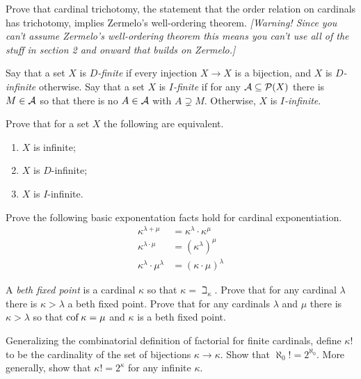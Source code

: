 \documentclass[10pt]{amsart}
\begin{document}
\begin{problem}
Prove that cardinal trichotomy, the statement that the order relation on cardinals has trichotomy, implies Zermelo's well-ordering theorem. \emph{[Warning! Since you can't assume Zermelo's well-ordering theorem this means you can't use all of the stuff in section 2 and onward that builds on Zermelo.]}
\end{problem}


\begin{problem}
Say that a set $X$ is \emph{$D$-finite} if every injection $X \to X$ is a bijection, and $X$ is \emph{$D$-infinite} otherwise. Say that a set $X$ is \emph{$I$-finite} if for any $\mathcal{A} \subseteq \mathcal{P}(X)$ there is $M \in \mathcal{A}$ so that there is no $A \in \mathcal{A}$ with $A \supsetneq M$. Otherwise, $X$ is \emph{$I$-infinite}.

Prove that for a set $X$ the following are equivalent.
\begin{enumerate}
\item $X$ is infinite;
\item $X$ is $D$-infinite;
\item $X$ is $I$-infinite.
\end{enumerate}
\end{problem}

\begin{problem}
Prove the following basic exponentation facts hold for cardinal exponentiation.
\begin{align*}
\kappa^{\lambda + \mu} &= \kappa^\lambda \cdot \kappa^\mu \\
\kappa^{\lambda \cdot \mu} &= \left(\kappa^\lambda\right)^\mu \\
\kappa^\lambda \cdot \mu^\lambda &= (\kappa \cdot \mu)^\lambda
\end{align*}
\end{problem}

\begin{problem}
A \emph{beth fixed point} is a cardinal $\kappa$ so that $\kappa = \beth_\kappa$. Prove that for any cardinal $\lambda$ there is $\kappa > \lambda$ a beth fixed point. Prove that for any cardinals $\lambda$ and $\mu$ there is $\kappa > \lambda$ so that $\operatorname{cof} \kappa = \mu$ and $\kappa$ is a beth fixed point.
\end{problem}

\begin{problem}
Generalizing the combinatorial definition of factorial for finite cardinals, define $\kappa !$ to be the cardinality of the set of bijections $\kappa \to \kappa$. Show that $\aleph_0! = 2^{\aleph_0}$. More generally, show that $\kappa ! = 2^\kappa$ for any infinite $\kappa$.
\end{problem}
\end{document}
